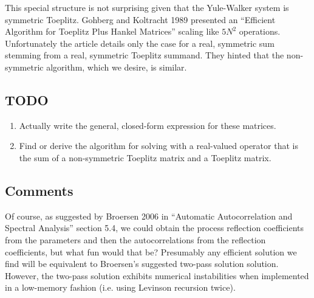 \documentclass[12pt,letterpaper]{article}
\begin{document}
This special structure is not surprising given that the Yule-Walker system is
symmetric Toeplitz. Gohberg and Koltracht 1989 presented an ``Efficient
Algorithm for Toeplitz Plus Hankel Matrices'' scaling like $5N^2$ operations.
Unfortunately the article details only the case for a real, symmetric sum
stemming from a real, symmetric Toeplitz summand. They hinted that the
non-symmetric algorithm, which we desire, is similar.

\subsection*{TODO}

\begin{enumerate}
 \item Actually write the general, closed-form expression for these matrices.
 \item Find or derive the algorithm for solving with a real-valued operator
  that is the sum of a non-symmetric Toeplitz matrix and a Toeplitz matrix.
\end{enumerate}

\subsection*{Comments}

Of course, as suggested by Broersen 2006 in ``Automatic Autocorrelation and
Spectral Analysis'' section 5.4, we could obtain the process reflection
coefficients from the parameters and then the autocorrelations from the
reflection coefficients, but what fun would that be?  Presumably any efficient
solution we find will be equivalent to Broersen's suggested two-pass solution
solution.  However, the two-pass solution exhibits numerical instabilities when
implemented in a low-memory fashion (i.e. using Levinson recursion twice).
\end{document}

